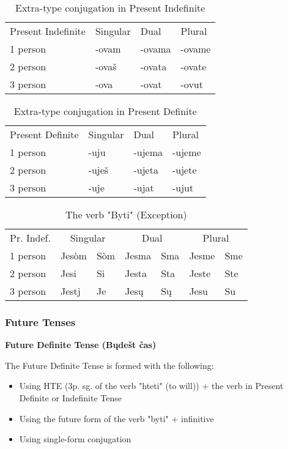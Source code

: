 \begin{table}[!htb]
	\caption{Extra-type conjugation in Present Indefinite}
	\begin{tabular}{llll}
		Present Indefinite & Singular & Dual & Plural \\
		1 person & -ovam & -ovama & -ovame \\
		2 person & -ovaš & -ovata & -ovate \\
		3 person & -ova & -ovat & -ovut
	\end{tabular}
\end{table}


\begin{table}[!htb]
	\caption{Extra-type conjugation in Present Definite}
	\begin{tabular}{llll}
		Present Definite & Singular & Dual & Plural \\
		1 person & -uju & -ujema & -ujeme \\
		2 person & -uješ & -ujeta & -ujete \\
		3 person & -uje & -ujat & -ujut
	\end{tabular}
\end{table}

\begin{table}[!htb]
	\caption{The verb "Byti" (Exception)}
	\begin{tabular}{lllllll}
		Pr. Indef.
			& \multicolumn{2}{c}{Singular}
			 & \multicolumn{2}{c}{Dual}
			 & \multicolumn{2}{c}{Plural} \\
		1 person & Jesòm & Sòm & Jesma & Sma & Jesme & Sme \\
		2 person & Jesi & Si & Jesta & Sta & Jeste & Ste \\
		3 person & Jestj & Je & Jesų & Sų & Jesu & Su
	\end{tabular}
\end{table}

\subsubsection{Future Tenses}

\textbf{Future Definite Tense (Bųdešt čas)}

The Future Definite Tense is formed with the following:

\begin{itemize}
	\item Using HTE (3p. sg. of the verb "hteti" (to will)) + the verb in Present Definite or Indefinite Tense
	\item Using the future form of the verb "byti" + infinitive
	\item Using single-form conjugation 
\end{itemize}

